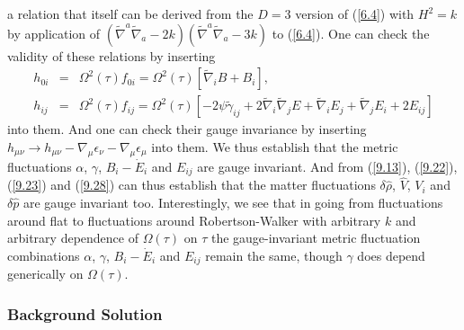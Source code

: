 %
a relation that itself can be  derived from the $D=3$ version of (\ref{6.4}) with $H^2=k$ by application  of $(\tilde{\nabla}^a\tilde{\nabla}_a-2k)(\tilde{\nabla}^a\tilde{\nabla}_a-3k)$ to (\ref{6.4}). One can check the validity of these relations by inserting 
%
\begin{eqnarray}
h_{0i}&=&\Omega^2(\tau)f_{0i}=\Omega^2(\tau)[\tilde{\nabla}_iB+B_i],
\\
h_{ij}&=&\Omega^2(\tau)f_{ij}=\Omega^2(\tau)[-2\psi\tilde{\gamma}_{ij} +2\tilde{\nabla}_i\tilde{\nabla}_j E + \tilde{\nabla}_i E_j + \tilde{\nabla}_j E_i + 2E_{ij}]
\nonumber
\label{9.48a}
\end{eqnarray}
%
into them. And one can check their gauge invariance by inserting $h_{\mu\nu}\rightarrow h_{\mu\nu}-\nabla_{\mu}\epsilon_{\nu}-\nabla_{\mu}\epsilon_{\mu}$ into them. We thus establish that the metric fluctuations $\alpha$, $\gamma$, $B_i-\dot{E}_i$ and $E_{ij}$ are gauge invariant. And from  (\ref{9.13}), (\ref{9.22}), (\ref{9.23}) and (\ref{9.28}) can thus establish that the matter fluctuations $\delta \hat{\rho}$, $\hat{V}$, $V_i$ and $\delta \hat{p}$ are gauge invariant too. Interestingly, we see that in going from fluctuations around flat to fluctuations around Robertson-Walker with arbitrary $k$ and arbitrary dependence of $\Omega(\tau)$ on $\tau$ the gauge-invariant metric fluctuation combinations $\alpha$, $\gamma$, $B_i-\dot{E}_i$ and $E_{ij}$  remain the same, though $\gamma$ does depend generically on $\Omega(\tau)$. 


\subsubsection{Background Solution}
\label{sss:solving_the_background_svt3}

